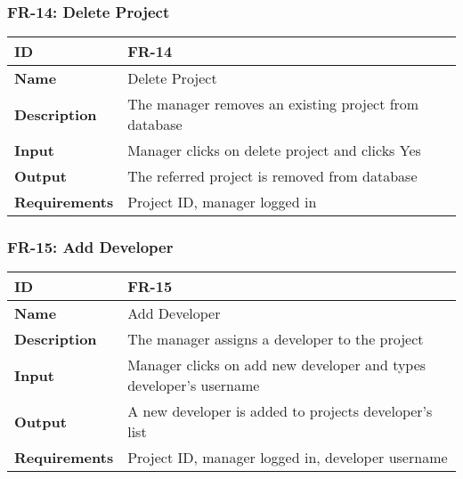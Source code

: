 \subsubsection{FR-14: Delete Project}
\begin{center}
  \begin{tabularx}{\textwidth}{|l|X|}
      \hline
      \textbf{ID} & FR-14 \\
      \hline
      \textbf{Name} & Delete Project \\
      \hline
      \textbf{Description} & The manager removes an existing project from database \\
      \hline
      \textbf{Input} & Manager clicks on delete project and clicks Yes \\
      \hline
      \textbf{Output} & The referred project is removed from database \\
      \hline
      \textbf{Requirements} & Project ID, manager logged in \\
      \hline
  \end{tabularx}
\end{center}

\subsubsection{FR-15: Add Developer}
\begin{center}
  \begin{tabularx}{\textwidth}{|l|X|}
      \hline
      \textbf{ID} & FR-15 \\
      \hline
      \textbf{Name} & Add Developer \\
      \hline
      \textbf{Description} & The manager assigns a developer to the project \\
      \hline
      \textbf{Input} & Manager clicks on add new developer and types developer's username \\
      \hline
      \textbf{Output} & A new developer is added to projects developer's list \\
      \hline
      \textbf{Requirements} & Project ID, manager logged in, developer username \\
      \hline
  \end{tabularx}
\end{center}

